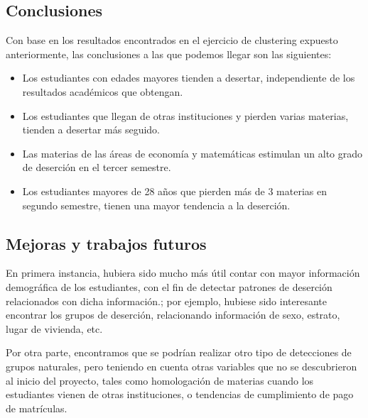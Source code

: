 \documentclass[fleqn,10pt]{SelfArx} %
\begin{document}
\subsection{Conclusiones}

Con base en los resultados encontrados en el ejercicio de clustering expuesto anteriormente, las conclusiones a las que podemos llegar son las siguientes:

\begin{itemize}
	\item Los estudiantes con edades mayores tienden a desertar, independiente de los resultados académicos que obtengan.
	\item Los estudiantes que llegan de otras instituciones y pierden varias materias, tienden a desertar más seguido.
	\item Las materias de las áreas de economía y matemáticas estimulan un alto grado de deserción en el tercer semestre.
	\item Los estudiantes mayores de 28 años que pierden más de 3 materias en segundo semestre, tienen una mayor tendencia a la deserción.
\end{itemize}

\subsection{Mejoras y trabajos futuros}

En primera instancia, hubiera sido mucho más útil contar con mayor información demográfica de los estudiantes, con el fin de detectar patrones de deserción relacionados con dicha información.; por ejemplo, hubiese sido interesante encontrar los grupos de deserción, relacionando información de sexo, estrato, lugar de vivienda, etc.

Por otra parte, encontramos que se podrían realizar otro tipo de detecciones de grupos naturales, pero teniendo en cuenta otras variables que no se descubrieron al inicio del proyecto, tales como homologación de materias cuando los estudiantes vienen de otras instituciones, o tendencias de cumplimiento de pago de matrículas.






\end{document}
